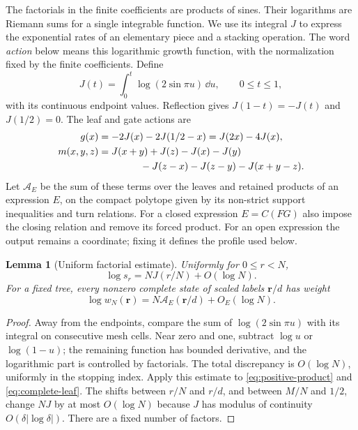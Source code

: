 \documentclass[11pt]{article}
\numberwithin{equation}{section}
\newtheorem{lemma}[theorem]{Lemma}
\theoremstyle{definition}\newtheorem{definition}[theorem]{Definition}
\theoremstyle{remark}\newtheorem{remark}[theorem]{Remark}
\begin{document}
The factorials in the finite coefficients are products of sines. Their logarithms are Riemann sums for a single integrable function. We use its integral $J$ to express the exponential rates of an elementary piece and a stacking operation. The word \emph{action} below means this logarithmic growth function, with the normalization fixed by the finite coefficients.
Define
\begin{equation}\label{eq:log-sine}
 J(t)=\int_0^t\log(2\sin\pi u)\,\dd u,\qquad 0\le t\le1,
\end{equation}
with its continuous endpoint values. Reflection gives $J(1-t)=-J(t)$ and $J(1/2)=0$. The leaf and gate actions are
\begin{align}
 g(x)&=-2J(x)-2J(1/2-x)=J(2x)-4J(x),\label{eq:g-action}\\
 m(x,y,z)&=J(x+y)+J(z)-J(x)-J(y)\notag\\
 &\hspace{15mm}-J(z-x)-J(z-y)-J(x+y-z).\label{eq:m-action}
\end{align}
Let $\mathcal A_E$ be the sum of these terms over the leaves and
retained products of an expression $E$, on the compact polytope given
by its non-strict support inequalities and turn relations. For a
closed expression $E=C(FG)$ also impose the closing relation and
remove its forced product. For an open expression the output remains
a coordinate; fixing it defines the profile used below.

\begin{lemma}[Uniform factorial estimate]\label{lem:factorial-action}
Uniformly for $0\le r<N$,
\[
 \log s_r=NJ(r/N)+O(\log N).
\]
For a fixed tree, every nonzero complete state of scaled labels $\mathbf r/d$ has weight
\begin{equation}\label{eq:uniform-state-action}
 \log w_N(\mathbf r)=N\mathcal A_E(\mathbf r/d)+O_E(\log N).
\end{equation}
\end{lemma}
\begin{proof}
Away from the endpoints, compare the sum of $\log(2\sin\pi u)$ with its integral on consecutive mesh cells. Near zero and one, subtract $\log u$ or $\log(1-u)$; the remaining function has bounded derivative, and the logarithmic part is controlled by factorials. The total discrepancy is $O(\log N)$, uniformly in the stopping index. Apply this estimate to \eqref{eq:positive-product} and \eqref{eq:complete-leaf}. The shifts between $r/N$ and $r/d$, and between $M/N$ and $1/2$, change $NJ$ by at most $O(\log N)$ because $J$ has modulus of continuity $O(\delta|\log\delta|)$. There are a fixed number of factors.
\end{proof}
\end{document}
